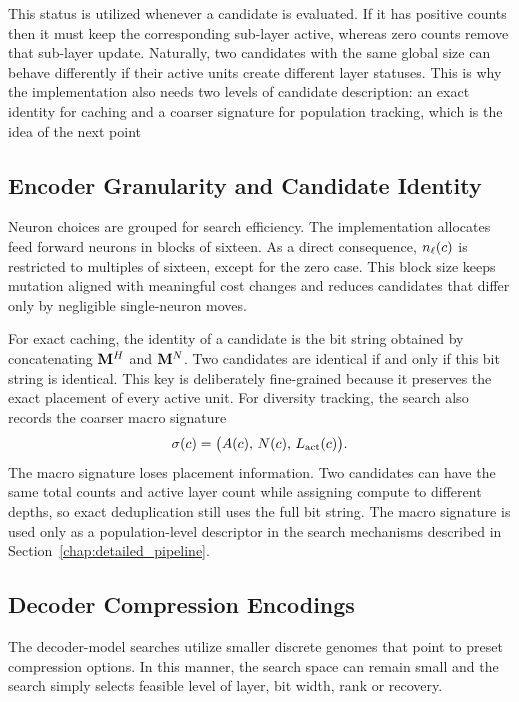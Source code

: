 This status is utilized whenever a candidate is evaluated. If it has positive counts then it must keep the corresponding sub-layer active, whereas zero counts remove that sub-layer update. Naturally, two candidates with the same global size can behave differently if their active units create different layer statuses. This is why the implementation also needs two levels of candidate description: an exact identity for caching and a coarser signature for population tracking, which is the idea of the next point


\subsection{Encoder Granularity and Candidate Identity}

Neuron choices are grouped for search efficiency. The implementation allocates feed forward neurons in blocks of sixteen. As a direct consequence, $n_\ell(c)$ is restricted to multiples of sixteen, except for the zero case. This block size keeps mutation aligned with meaningful cost changes and reduces candidates that differ only by negligible single-neuron moves.

For exact caching, the identity of a candidate is the bit string obtained by concatenating $\mathbf{M}^{H}$ and $\mathbf{M}^{N}$. Two candidates are identical if and only if this bit string is identical. This key is deliberately fine-grained because it preserves the exact placement of every active unit. For diversity tracking, the search also records the coarser macro signature
\begin{equation}
\sigma(c)
=
\big(A(c),\,N(c),\,L_{\mathrm{act}}(c)\big).
\end{equation}
The macro signature loses placement information. Two candidates can have the same total counts and active layer count while assigning compute to different depths, so exact deduplication still uses the full bit string. The macro signature is used only as a population-level descriptor in the search mechanisms described in Section~\ref{chap:detailed_pipeline}.

\subsection{Decoder Compression Encodings}
\label{sec:other_candidate_forms}
\label{sec:decoder_compression_encodings}

The decoder-model searches utilize smaller discrete genomes that point to preset compression options. In this manner, the search space can remain small and the search simply selects feasible level of layer, bit width, rank or recovery. 

